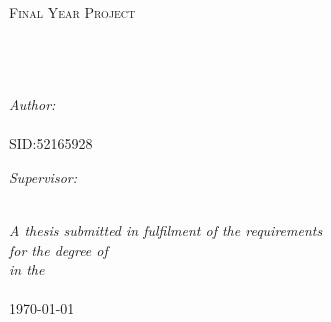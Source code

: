 \documentclass[12pt, a4paper, oneside]{Thesis} %
\begin{document}
\begin{titlepage}
\begin{center}

\textsc{\LARGE \univname}\\[1.5cm] %
\textsc{\Large Final Year Project}\\[0.5cm] %

\HRule \\[0.4cm] %
{\huge \bfseries \ttitle}\\[0.4cm] %
\HRule \\[1.5cm] %
 
\begin{minipage}{0.4\textwidth}
\begin{flushleft} \large
\emph{Author:}\\
{\authornames} %
\\{SID:52165928}
\end{flushleft}
\end{minipage}
\begin{minipage}[t]{0.4\textwidth}
\begin{flushright} \large
\emph{Supervisor:} \\
\href{http://www6.cityu.edu.hk/ma/people/profile/zhuangxs.htm}{\supname} %
\end{flushright}
\end{minipage}\\[3cm]
 
\large \textit{A thesis submitted in fulfilment of the requirements\\ for the degree of \degreename}\\[0.3cm] %
\textit{in the}\\[0.4cm]
\deptname\\[2cm] %
 
{\large \today}\\[4cm] %
 
\vfill
\end{center}

\end{titlepage}
\end{document}
